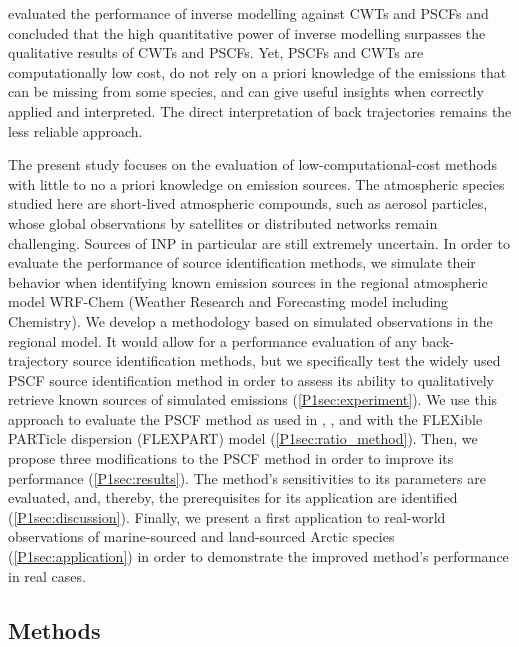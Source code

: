     \citet{fang_performance_2018}  evaluated the performance of inverse modelling against CWTs and PSCFs and concluded that the high quantitative power of inverse modelling surpasses the qualitative results of CWTs and PSCFs. Yet, PSCFs and CWTs are computationally low cost, do not rely on a priori knowledge of the emissions that can be missing from some species, and can give useful insights when correctly applied and interpreted. The direct interpretation of back trajectories remains the less reliable approach.

    The present study focuses on the evaluation of low-computational-cost methods with little to no a priori knowledge on emission sources. The atmospheric species studied here are short-lived atmospheric compounds, such as aerosol particles, whose global observations by satellites or distributed networks remain challenging.
    Sources of INP in particular are still extremely uncertain.
    In  order to evaluate the performance of source identification methods, we simulate their behavior when identifying known emission sources in the regional atmospheric model WRF-Chem ({Weather Research and Forecasting model including Chemistry}). We develop a methodology based on simulated observations in the regional model. It would allow for a performance evaluation of any back-trajectory source identification methods, but we specifically test the widely used PSCF source identification method in order to assess its ability to qualitatively retrieve known sources of simulated emissions (\cref{P1sec:experiment}). We use this approach to evaluate the PSCF method as used in \citet{hirdman_source_2010}, \citet{irish_ice_2019}, and \citet{si_concentrations_2019} with the FLEXible PARTicle dispersion (FLEXPART) model (\cref{P1sec:ratio_method}).
    Then, we propose three modifications to the PSCF method in order to improve its performance (\cref{P1sec:results}). The method's sensitivities to its parameters are evaluated, and, thereby, the prerequisites for its application are identified (\cref{P1sec:discussion}). Finally, we present a first application to real-world observations of marine-sourced and land-sourced Arctic species (\cref{P1sec:application}) in order to demonstrate the improved method's performance in real cases.

    \subsection{Methods}
        \label{P1sec:method}
    
